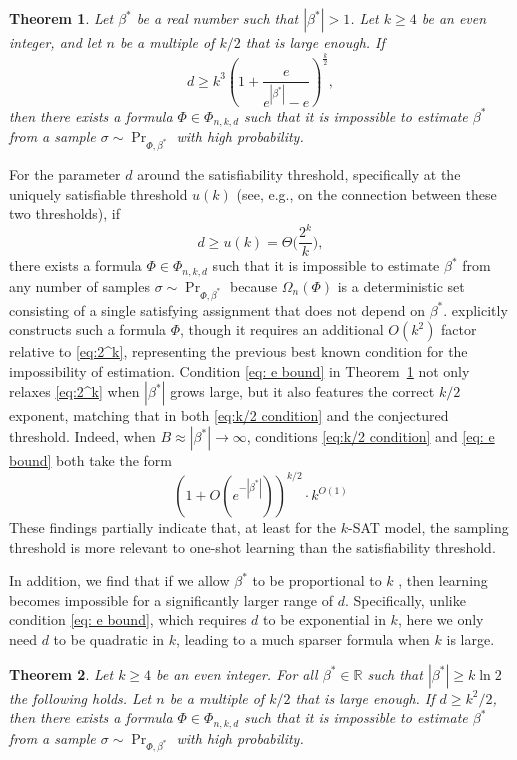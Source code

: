 \documentclass[11pt]{article}
\newtheorem{theorem}{Theorem}[section]
\theoremstyle{definition}
\theoremstyle{remark}
\begin{document}
\begin{theorem}
   \label{thm: impossible4}
   Let  $\beta^*$ be a real number such that $|\beta^*|>1$. 
       Let  $k \geq 4$ be an even integer, and let $n$ be a multiple of $k/2$ that is large enough. 
    If     \begin{equation}
        \label{eq: e bound}
        d \ge k^3 \left( 1 + \frac{e}{e^{|\beta^*|}-e} \right)^{\frac{k}{2}},
    \end{equation}
    then there exists a formula $\Phi\in \Phi_{n,k,d}$ such that 
    it is impossible to estimate $\beta^*$ from a sample $\sigma \sim \Pr_{\Phi, \beta^*}$ with high probability.
\end{theorem}
For the parameter $d$ around the satisfiability threshold, specifically at the uniquely satisfiable threshold $u(k)$ (see, e.g., \cite{MP10} on the connection between these two thresholds), if
\begin{equation}
    \label{eq:2^k}
    d \ge u(k) =\Theta\Big(\frac{2^{k}}{k}\Big),
\end{equation}
there exists a formula $\Phi\in\Phi_{n,k,d}$ such that it  is impossible to estimate $\beta^*$ from any number of samples $\sigma\sim \Pr_{\Phi, \beta^*}$ 
because $\Omega_n(\Phi)$ is a deterministic set consisting of a single satisfying assignment that does not depend on $\beta^*$. \cite{GKK24} explicitly constructs such a formula $\Phi$, though it requires an additional $O(k^2)$ factor relative to \eqref{eq:2^k}, representing the previous best known condition for the impossibility of estimation.
Condition \eqref{eq: e bound} in Theorem~\ref{thm: impossible4} not only relaxes \eqref{eq:2^k} when $|\beta^*|$ grows large, but it also features the correct $k/2$
 exponent, matching that in both \eqref{eq:k/2 condition} and the conjectured threshold.
Indeed, when $B\approx |\beta^*|\rightarrow \infty$, conditions \eqref{eq:k/2 condition} and \eqref{eq: e bound} both take the form 
\begin{equation}
    (1+O(e^{-|\beta^*|}))^{k/2}\cdot k^{O(1)}
\end{equation}
These findings partially indicate that, at least for the 
$k$-SAT model, the sampling threshold is more relevant to one-shot learning than the satisfiability threshold.


In addition, we find that if we allow 
 $\beta^*$  to be proportional to  $k$ , then learning becomes impossible for a significantly larger range of $d$.
Specifically, unlike condition \eqref{eq: e bound}, which requires  $d$ to be exponential in $k$, here we only need 
$d$ to be quadratic in $k$, leading to a much sparser formula when $k$ is large.
\begin{theorem}
\label{thm:impossible2}
Let $k\geq 4$ be an even integer. For all $\beta^*\in\mathbb{R}$ such that 
         $|\beta^*| \ge k\ln2 $ the following holds. Let $n$ be a multiple of $k/2$ that is large enough. If
     $d\ge k^2/2$, then there exists a formula $\Phi\in \Phi_{n,k,d}$ such that 
    it is impossible to estimate $\beta^*$ from a sample $\sigma \sim \Pr_{\Phi, \beta^*}$ with high probability.
\end{theorem}
\end{document}
